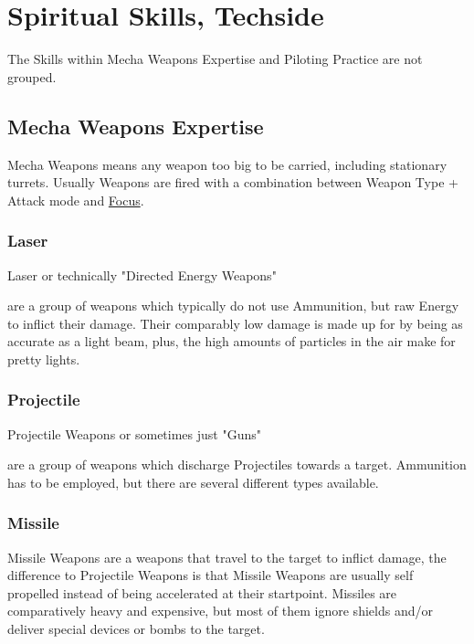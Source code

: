 \section{Spiritual Skills, Techside}\label{sec:spiritual-skills,-techside}
The Skills within Mecha Weapons Expertise and Piloting Practice are not grouped.
\subsection{Mecha Weapons Expertise}\label{subsec:mecha-weapons-expertise}
Mecha Weapons means any weapon too big to be carried, including stationary turrets.
Usually Weapons are fired with a combination between Weapon Type + Attack mode and \hyperref[itm:focus]{Focus}.
\subsubsection{Laser}
Laser or technically "Directed Energy Weapons" \par
are a group of weapons which typically do not use Ammunition, but raw Energy to inflict their damage.
Their comparably low damage is made up for by being as accurate as a light beam,
plus, the high amounts of particles in the air make for pretty lights.
\subsubsection{Projectile}
Projectile Weapons or sometimes just "Guns" \par
are a group of weapons which discharge Projectiles towards a target.
Ammunition has to be employed, but there are several different types available.
\subsubsection{Missile}
Missile Weapons are a weapons that travel to the target to inflict damage, the difference
to Projectile Weapons is that Missile Weapons are usually self propelled instead of being accelerated at their
startpoint.
Missiles are comparatively heavy and expensive, but most of them ignore shields and/or deliver
special devices or bombs to the target.
